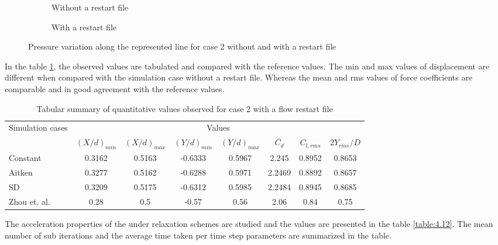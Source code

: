 
\begin{figure}[H]
\centering
	\begin{subfigure}[t]{7cm}
		\caption{Without a restart file}
	\end{subfigure}
	\begin{subfigure}[t]{7cm}
		\fbox{\texttt{[image: PP\_wr]}}
		\caption{With a restart file}
	\end{subfigure}
\caption{Pressure variation along the represented line for case 2 without and with a restart file}
\label{fig:4.22}
\end{figure}

In the table \ref{table:4.11}, the observed values are tabulated and compared with the reference values. The min and max values of displacement are different when compared with the simulation case without a restart file. Whereas the mean and rms values of force coefficients are comparable and in good agreement with the reference values.

\begin{table}[htbp]
  \centering
   \begin{tabular}{|l|c|c|c|c|c|c|c|}
    \hline
    \multicolumn{1}{|c|}{\multirow{2}[4]{*}{Simulation cases}} & \multicolumn{7}{c|}{Values} \\
\cline{2-8}          & $(X/d)_{min}$ & $(X/d)_{max}$ & $(Y/d)_{min}$ & $(Y/d)_{max}$ & $\bar{C_d}$  & $C_{l,rms}$ & $2Y_{rms}/D$ \\
    \hline
	Constant  & 0.3162 & 0.5163 & -0.6333 & 0.5967 & 2.245 & 0.8952 & 0.8653 \\
    \hline
    Aitken  & 0.3277 & 0.5162 & -0.6288 & 0.5971 & 2.2469 & 0.8892 & 0.8657 \\
    \hline
    SD    & 0.3209 & 0.5175 & -0.6312 & 0.5985 & 2.2484 & 0.8945 & 0.8685 \\
    \hline
    Zhou et. al. & 0.28 & 0.5 & -0.57 & 0.56 & 2.06 & 0.84 & 0.75 \\
    \hline
    \end{tabular}%
    \caption{Tabular summary of quantitative values observed for case 2 with a flow restart file}
  \label{table:4.11}%
\end{table}%

The acceleration properties of the under relaxation schemes are studied and the values are presented in the table \ref{table:4.12}. The mean number of sub iterations and the average time taken per time step parameters are summarized in the table.

